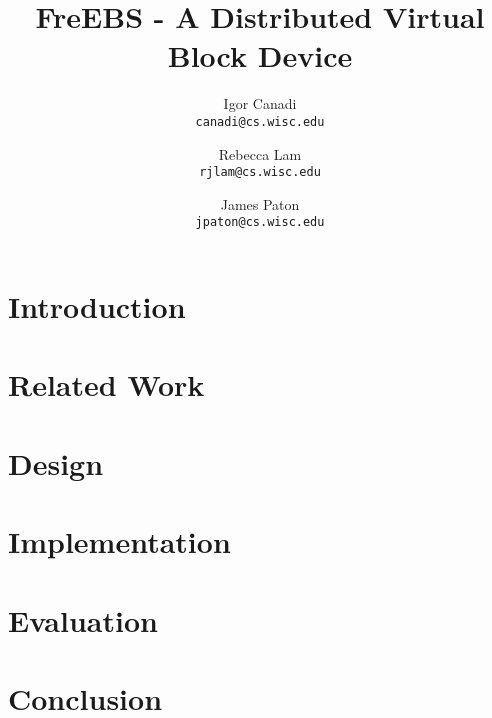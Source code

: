 \documentclass[10pt, two column]{article}
\begin{document}
\title{FreEBS - A Distributed Virtual Block Device}


\author{
Igor Canadi\\
\texttt{canadi@cs.wisc.edu}
\and
Rebecca Lam\\
\texttt{rjlam@cs.wisc.edu}
\and
James Paton\\
\texttt{jpaton@cs.wisc.edu}
}
\date{}
\maketitle



\section{Introduction}
\label{sec:intro}


\section{Related Work}
\label{sec:related}


\section{Design}
\label{sec:design}


\section{Implementation}
\label{sec:implementation}


\section{Evaluation}
\label{sec:evaluation}


\section{Conclusion}
\label{sec:conc}




\end{document}
